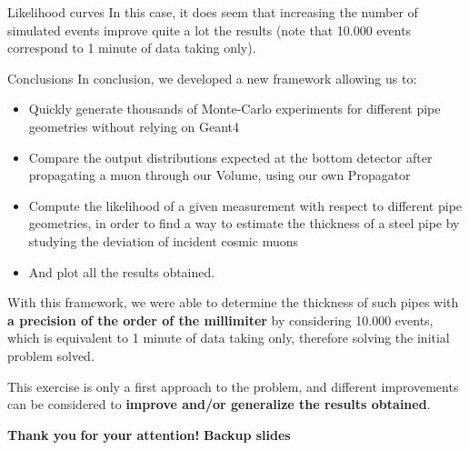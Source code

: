 \documentclass[8 pt]{beamer}
\begin{document}
\begin{frame}{Likelihood curves}
In this case, it does seem that increasing the number of simulated events improve quite a lot the results (note that 10.000 events correspond to 1 minute of data taking only). \vfill
\end{frame}










\begin{frame}{Conclusions}
\justifying
In conclusion, we developed a new framework allowing us to:
\begin{itemize}
\justifying
\item Quickly generate thousands of Monte-Carlo experiments for different pipe geometries without relying on Geant4
\item Compare the output distributions expected at the bottom detector after propagating a muon through our Volume, using our own Propagator
\item Compute the likelihood of a given measurement with respect to different pipe geometries, in order to find a way to estimate the thickness of a steel pipe by studying the deviation of incident cosmic muons
\item And plot all the results obtained.
\end{itemize} \vfill

\begin{exampleblock}{}
\justifying
With this framework, we were able to determine the thickness of such pipes with \textbf{a precision of the order of the millimiter} by considering 10.000 events, which is equivalent to 1 minute of data taking only, therefore solving the initial problem solved. 
\end{exampleblock} \vfill

This exercise is only a first approach to the problem, and different improvements can be considered to \textbf{improve and/or generalize the results obtained}. \vfill
\end{frame}










\begin{frame}{}
	\centering
	\huge{\textbf{\color{mycolor} Thank you  \color{black}}} \newline
	\LARGE{\textbf{\color{mycolor} for your attention! \color{black}}} \vfill
	\LARGE{\textbf{\color{mycolor} Backup slides \color{black}}}
\end{frame}
\end{document}
